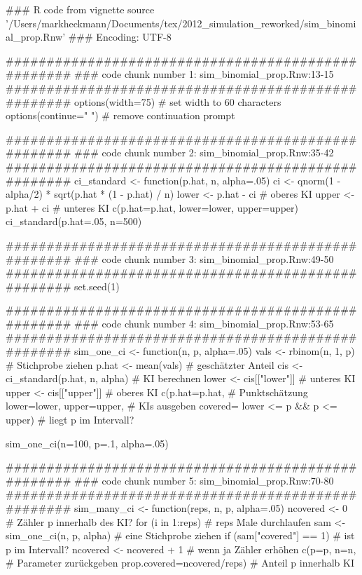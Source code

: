 ### R code from vignette source '/Users/markheckmann/Documents/tex/2012_simulation_reworked/sim_binomial_prop.Rnw'
### Encoding: UTF-8

###################################################
### code chunk number 1: sim_binomial_prop.Rnw:13-15
###################################################
options(width=75)         # set width to 60 characters
options(continue=" ")     # remove continuation prompt


###################################################
### code chunk number 2: sim_binomial_prop.Rnw:35-42
###################################################
ci_standard <- function(p.hat, n, alpha=.05){
  ci <- qnorm(1 - alpha/2) * sqrt(p.hat * (1 - p.hat) / n) 
  lower <- p.hat - ci                       # oberes KI            
  upper <- p.hat + ci                       # unteres KI
  c(p.hat=p.hat, lower=lower, upper=upper)
}  
ci_standard(p.hat=.05, n=500)


###################################################
### code chunk number 3: sim_binomial_prop.Rnw:49-50
###################################################
set.seed(1)


###################################################
### code chunk number 4: sim_binomial_prop.Rnw:53-65
###################################################
sim_one_ci <- function(n, p, alpha=.05){
  vals <- rbinom(n, 1, p)                # Stichprobe ziehen 
  p.hat <- mean(vals)                    # geschätzter Anteil 
  cis <- ci_standard(p.hat, n, alpha)    # KI berechnen
  lower <- cis[["lower"]]                # unteres KI
  upper <- cis[["upper"]]                # oberes KI
  c(p.hat=p.hat,                         # Punktschätzung
    lower=lower, upper=upper,            # KIs ausgeben
    covered= lower <= p && p <= upper)   # liegt p im Intervall?
}

sim_one_ci(n=100, p=.1, alpha=.05)


###################################################
### code chunk number 5: sim_binomial_prop.Rnw:70-80
###################################################
sim_many_ci <- function(reps, n, p, alpha=.05){
  ncovered <- 0                       # Zähler p innerhalb des KI?
  for (i in 1:reps){                  # reps Male durchlaufen
    sam <- sim_one_ci(n, p, alpha)    # eine Stichprobe ziehen
    if (sam["covered"] == 1)          # ist p im Intervall?       
      ncovered <- ncovered + 1        # wenn ja Zähler erhöhen 
  }
  c(p=p, n=n,                         # Parameter zurückgeben
    prop.covered=ncovered/reps)       # Anteil p innerhalb KI
}


